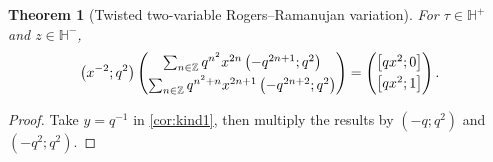 \documentclass[reqno,11pt]{amsart}
\newtheorem{theorem}{Theorem}[section]
\theoremstyle{definition}
\theoremstyle{remark}
\numberwithin{equation}{section}
\newcommand{\Z}{\mathbb{Z}}
\renewcommand{\H}{{\mathbb{H}}}
\newcommand{\vect}[2]{\big[{#1};{#2}\big]}
\begin{document}
\begin{theorem}[Twisted two-variable Rogers--Ramanujan variation] \label{thm:twisted-rog-ram-var}
For $\tau \in \H^+$ and $z \in \H^-$,
\[
    \left(x^{-2}; q^2\right)
    \begin{pmatrix}
    \sum_{n \in \Z} q^{n^2} x^{2n} \left(-q^{2n+1}; q^2\right)
    \vspace{0.1cm} \\
    \sum_{n \in \Z} q^{n^2+n} x^{2n+1} \left(-q^{2n+2}; q^2\right)
    \end{pmatrix}
    =
    \begin{pmatrix}
    \vect{qx^2}{0}
    \vspace{0.1cm} \\
    \vect{qx^2}{1}
    \end{pmatrix}.
\]
\end{theorem}

\begin{proof}
Take $y = q^{-1}$ in \cref{cor:kind1}, then multiply the results by $\left(-q; q^2\right)$ and $\left(-q^2; q^2\right)$. 
\end{proof}
\end{document}

